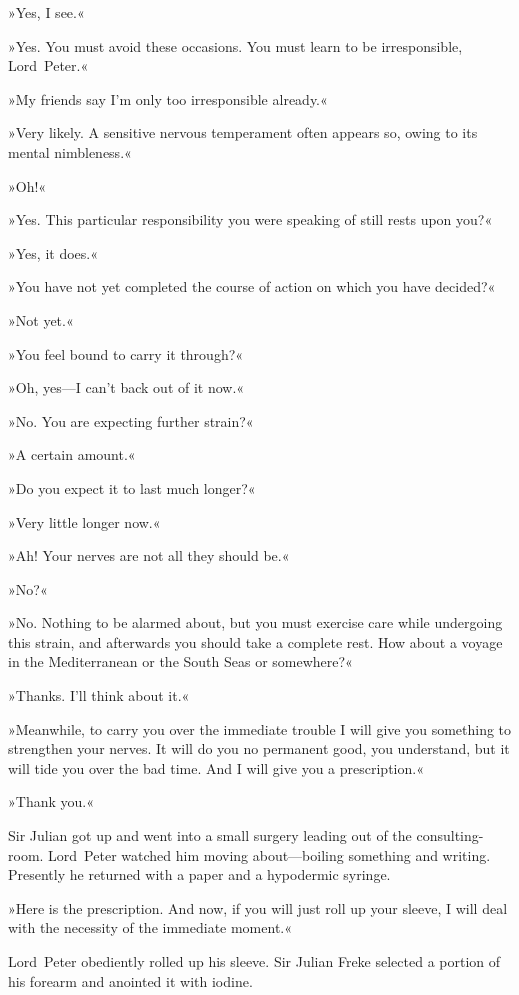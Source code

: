 »Yes, I see.«

»Yes. You must avoid these occasions. You must learn to be irresponsible, Lord~Peter.«

»My friends say I'm only too irresponsible already.«

»Very likely. A sensitive nervous temperament often appears so, owing to its mental nimbleness.«

»Oh!«

»Yes. This particular responsibility you were speaking of still rests upon you?«

»Yes, it does.«

»You have not yet completed the course of action on which you have decided?«

»Not yet.«

»You feel bound to carry it through?«

»Oh, yes—I can't back out of it now.«

»No. You are expecting further strain?«

»A certain amount.«

»Do you expect it to last much longer?«

»Very little longer now.«

»Ah! Your nerves are not all they should be.«

»No?«

»No. Nothing to be alarmed about, but you must exercise care while undergoing this strain, and afterwards you should take a complete rest. How about a voyage in the Mediterranean or the South Seas or somewhere?«

»Thanks. I'll think about it.«

»Meanwhile, to carry you over the immediate trouble I will give you something to strengthen your nerves. It will do you no permanent good, you understand, but it will tide you over the bad time. And I will give you a prescription.«

»Thank you.«

Sir Julian got up and went into a small surgery leading out of the consulting-room. Lord~Peter watched him moving about—boiling something and writing. Presently he returned with a paper and a hypodermic syringe.

»Here is the prescription. And now, if you will just roll up your sleeve, I will deal with the necessity of the immediate moment.«

Lord~Peter obediently rolled up his sleeve. Sir Julian Freke selected a portion of his forearm and anointed it with iodine.

